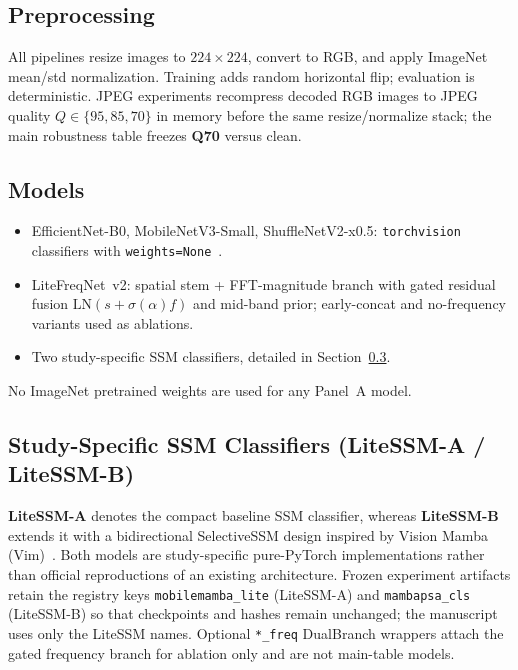 \subsection{Preprocessing}

All pipelines resize images to $224\times224$, convert to RGB, and apply ImageNet mean/std normalization.
Training adds random horizontal flip; evaluation is deterministic.
JPEG experiments recompress decoded RGB images to JPEG quality $Q\in\{95,85,70\}$ in memory before the same resize/normalize stack; the main robustness table freezes \textbf{Q70} versus clean.

\subsection{Models}

\begin{itemize}
\item EfficientNet-B0, MobileNetV3-Small, ShuffleNetV2-x0.5: \texttt{torchvision} classifiers with \texttt{weights=None}~\cite{tan2019efficientnet,howard2019mobilenetv3,ma2018shufflenet}.
\item LiteFreqNet~v2: spatial stem + FFT-magnitude branch with gated residual fusion $\mathrm{LN}\!\left(s+\sigma(\alpha)f\right)$ and mid-band prior; early-concat and no-frequency variants used as ablations.
\item Two study-specific SSM classifiers, detailed in Section~\ref{sec:litessm}.
\end{itemize}
No ImageNet pretrained weights are used for any Panel~A model.

\subsection{Study-Specific SSM Classifiers (LiteSSM-A / LiteSSM-B)}
\label{sec:litessm}

\textbf{LiteSSM-A} denotes the compact baseline SSM classifier, whereas \textbf{LiteSSM-B} extends it with a bidirectional SelectiveSSM design inspired by Vision Mamba (Vim)~\cite{zhu2024vim}.
Both models are study-specific pure-PyTorch implementations rather than official reproductions of an existing architecture.
Frozen experiment artifacts retain the registry keys \texttt{mobilemamba\_lite} (LiteSSM-A) and \texttt{mambapsa\_cls} (LiteSSM-B) so that checkpoints and hashes remain unchanged; the manuscript uses only the LiteSSM names.
Optional \texttt{*\_freq} DualBranch wrappers attach the gated frequency branch for ablation only and are not main-table models.

